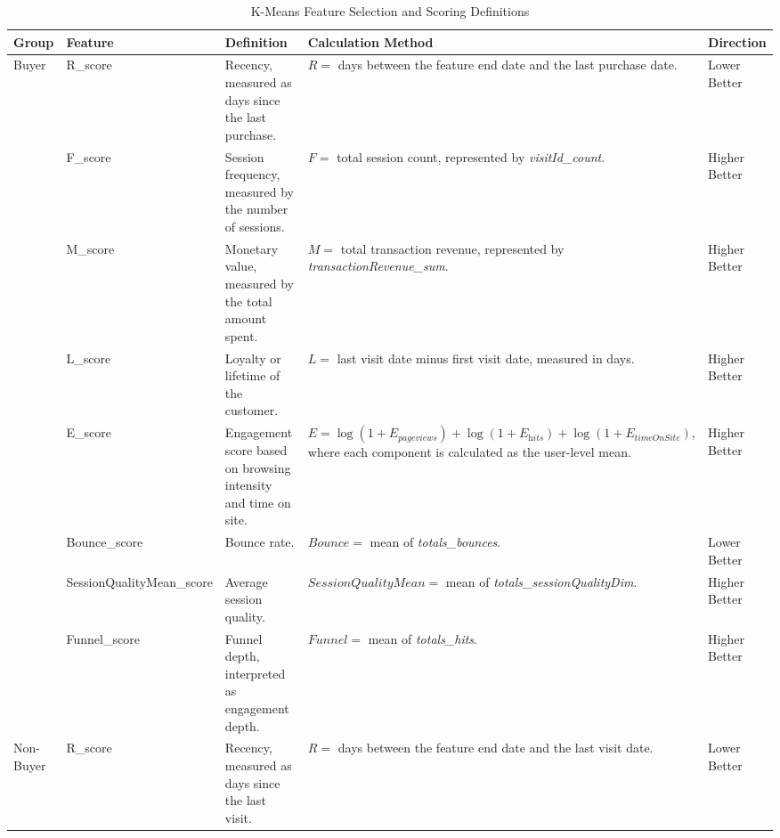 \documentclass[conference]{IEEEtran}
\begin{document}
\begin{table}[H]
\centering
\caption{K-Means Feature Selection and Scoring Definitions}
\label{tab:kmeans_features}
\footnotesize
\renewcommand{\arraystretch}{1.12}
\setlength{\tabcolsep}{4pt}

\begin{tabularx}{\textwidth}{@{} l l X X l @{}}
\toprule
\textbf{Group} 
& \textbf{Feature} 
& \textbf{Definition} 
& \textbf{Calculation Method} 
& \textbf{Direction} \\ 
\midrule

\multirow{8}{*}{Buyer} 
& R\_score 
& Recency, measured as days since the last purchase. 
& $R =$ days between the feature end date and the last purchase date. 
& Lower Better \\

& F\_score 
& Session frequency, measured by the number of sessions. 
& $F =$ total session count, represented by \textit{visitId\_count}. 
& Higher Better \\

& M\_score 
& Monetary value, measured by the total amount spent. 
& $M =$ total transaction revenue, represented by \textit{transactionRevenue\_sum}. 
& Higher Better \\

& L\_score 
& Loyalty or lifetime of the customer. 
& $L =$ last visit date minus first visit date, measured in days. 
& Higher Better \\

& E\_score 
& Engagement score based on browsing intensity and time on site. 
& $E = \log(1+E_{\textit{pageviews}}) + \log(1+E_{\textit{hits}}) + \log(1+E_{\textit{timeOnSite}})$, where each component is calculated as the user-level mean. 
& Higher Better \\

& Bounce\_score 
& Bounce rate. 
& $Bounce =$ mean of \textit{totals\_bounces}. 
& Lower Better \\

& SessionQualityMean\_score 
& Average session quality. 
& $SessionQualityMean =$ mean of \textit{totals\_sessionQualityDim}. 
& Higher Better \\

& Funnel\_score 
& Funnel depth, interpreted as engagement depth. 
& $Funnel =$ mean of \textit{totals\_hits}. 
& Higher Better \\

\midrule

\multirow{6}{*}{Non-Buyer} 
& R\_score 
& Recency, measured as days since the last visit. 
& $R =$ days between the feature end date and the last visit date. 
& Lower Better \\


\end{tabularx}
\end{table}
\end{document}
